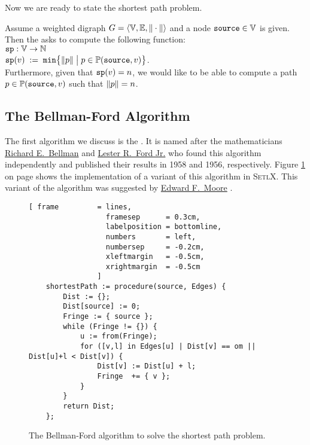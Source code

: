 \noindent
Now we are ready to state the shortest path problem.

\begin{Definition} \lb
  Assume a weighted digraph  
  $G = \langle {\mathbb V}, {\mathbb E}, \|\cdot\| \rangle$ 
  and a node $\mbox{\tt source} \in {\mathbb V}$ is given.  Then the  asks to compute
  the following function:
  \\[0.2cm]
  \hspace*{1.3cm} $\mathtt{sp}: {\mathbb V} \rightarrow {\mathbb N}$ \\[0.1cm]
  \hspace*{1.3cm} $\mathtt{sp}(v) \;:=\; \mathtt{min}\bigl\{ \|p\| \bigm| p \in {\mathbb P}(\mbox{\tt source},v) \bigr\}$.
  \\[0.2cm]
  Furthermore, given that $\mathtt{sp}(v) = n$, we would like to be able to compute a path 
  $p \in {\mathbb P}(\mbox{\tt source},v)$ such that $\|p\| = n$.
  \eox
\end{Definition}

\subsection{The Bellman-Ford Algorithm}
The first algorithm we discuss is the
\href{https://en.wikipedia.org/wiki/Bellman-Ford_algorithm}{}.
It is named after the mathematicians 
\href{https://en.wikipedia.org/wiki/Richard_E._Bellman}{Richard E.~Bellman} \cite{bellman:58} and 
\href{https://en.wikipedia.org/wiki/L._R._Ford_Jr.}{Lester R.~Ford Jr.} \cite{ford:56} who found this algorithm
independently and published their results in 1958 and 1956, respectively.  Figure
\ref{fig:moore.stlx} on page \pageref{fig:moore.stlx} shows the implementation of a variant of this 
algorithm in \textsc{SetlX}.  This variant of the algorithm was suggested by 
\href{https://en.wikipedia.org/wiki/Edward_F._Moore}{Edward F.~Moore} \cite{moore:59}.


\begin{figure}[!ht]
  \centering
\begin{Verbatim}[ frame         = lines, 
                  framesep      = 0.3cm, 
                  labelposition = bottomline,
                  numbers       = left,
                  numbersep     = -0.2cm,
                  xleftmargin   = -0.5cm,
                  xrightmargin  = -0.5cm
                ]
    shortestPath := procedure(source, Edges) {
        Dist := {};
        Dist[source] := 0;
        Fringe := { source };
        while (Fringe != {}) {
            u := from(Fringe);
            for ([v,l] in Edges[u] | Dist[v] == om || Dist[u]+l < Dist[v]) {
                Dist[v] := Dist[u] + l;
                Fringe  += { v };
            }
        }
        return Dist;
    };
\end{Verbatim}
\vspace*{-0.3cm}
  \caption{The Bellman-Ford algorithm to solve the shortest path problem.}
  \label{fig:moore.stlx}
\end{figure} 

